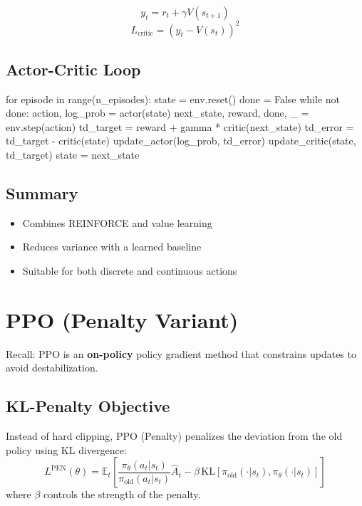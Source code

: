\documentclass{article}
\begin{document}
\begin{equation}
    y_t = r_t + \gamma V(s_{t+1})
\end{equation}
\begin{equation}
    L_{\text{critic}} = \left( y_t - V(s_t) \right)^2
\end{equation}

\subsection{Actor-Critic Loop}

\begin{python}
for episode in range(n_episodes):
    state = env.reset()
    done = False
    while not done:
        action, log_prob = actor(state)
        next_state, reward, done, _ = env.step(action)
        td_target = reward + gamma * critic(next_state)
        td_error = td_target - critic(state)
        update_actor(log_prob, td_error)
        update_critic(state, td_target)
        state = next_state
\end{python}

\subsection{Summary}

\begin{itemize}
    \item Combines REINFORCE and value learning
    \item Reduces variance with a learned baseline
    \item Suitable for both discrete and continuous actions
\end{itemize}

\section{PPO (Penalty Variant)}

Recall: PPO is an \textbf{on-policy} policy gradient method that constrains updates to avoid destabilization.

\subsection{KL-Penalty Objective}

Instead of hard clipping, PPO (Penalty) penalizes the deviation from the old policy using KL divergence:
\begin{equation}
    L^{\text{PEN}}(\theta) = \mathbb{E}_t \left[ \frac{\pi_\theta(a_t|s_t)}{\pi_{\text{old}}(a_t|s_t)} \hat{A}_t - \beta \, \text{KL}[\pi_{\text{old}}(\cdot|s_t), \pi_\theta(\cdot|s_t)] \right]
\end{equation}
where $\beta$ controls the strength of the penalty.
\end{document}
